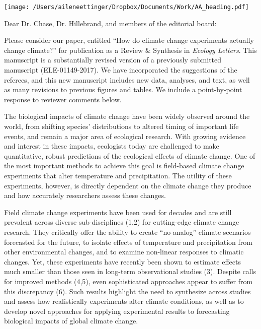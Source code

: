 \documentclass[11pt,a4paper]{letter}
\begin{document}


\begin{letter}{}
\texttt{[image: /Users/aileneettinger/Dropbox/Documents/Work/AA\_heading.pdf]}

\opening{Dear Dr. Chase, Dr. Hillebrand, and members of the editorial board:}
Please consider our paper, entitled ``How do climate change experiments actually change climate?'' for publication as a Review \& Synthesis in \emph{Ecology Letters}. This manuscript is a substantially revised version of a previously submitted manuscript  (ELE-01149-2017). We have incorporated the suggestions of the referees, and this new manuscript includes new data, analyses, and text, as well as many revisions to previous figures and tables. We include a point-by-point response to reviewer comments below.

The biological impacts of climate change have been widely observed around the world, from shifting species' distributions to altered timing of important life events, and remain a major area of ecological research. With growing evidence and interest in these impacts, ecologists today are challenged to make quantitative, robust predictions of the ecological effects of climate change. One of the most important methods to achieve this goal is field-based climate change experiments that alter temperature and precipitation. The utility of these experiments, however, is directly dependent on the climate change they produce and how accurately researchers assess these changes. 

Field climate change experiments have been used for decades and are still prevalent across diverse sub-disciplines  (1,2) %
for cutting-edge climate change research. They critically offer the ability to create ``no-analog'' climate scenarios forecasted for the future, to isolate effects of temperature and precipitation from other environmental changes, and to examine non-linear responses to climatic changes. Yet, these experiments have recently been shown to estimate effects much smaller than those seen in long-term observational studies (3). %
Despite calls for improved methods (4,5), %
even sophisticated approaches appear to suffer from this discrepancy (6). %
Such results highlight the need to synthesize across studies and assess how realistically experiments alter climate conditions, as well as to develop novel approaches for applying experimental results to forecasting biological impacts of global climate change. 


\end{letter}
\end{document}
